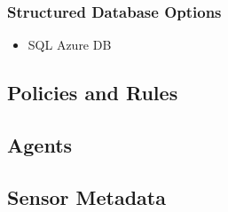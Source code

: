 	\subsubsection{Structured Database Options}
		\begin{itemize}
		\item SQL Azure DB
		\end{itemize}
	\subsection{Policies and Rules}
	\subsection{Agents}
	\subsection{Sensor Metadata}
